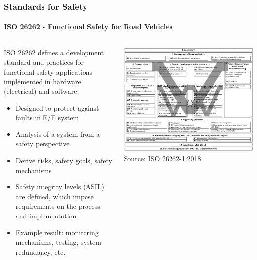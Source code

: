 \begin{frame}
\frametitle{Standards for Safety}
\framesubtitle{ISO 26262 - Functional Safety for Road Vehicles}
\begin{columns}[]
    \begin{column}{0.6\textwidth}
        ISO 26262 defines a development standard and practices for functional safety
        applications implemented in hardware (electrical) and software.\\
        \begin{itemize}
            \item Designed to protect against faults in E/E system
            \item Analysis of a system from a safety perspective
            \item Derive risks, safety goals, safety mechanisms
            \item Safety integrity levels (ASIL) are defined, which impose
                requirements on the process and implementation
            \item Example result: monitoring mechanisms, testing,
                system redundancy, etc.
        \end{itemize}
    \end{column}
    \begin{column}{0.4\textwidth}
        \centering
        \includegraphics[width=\textwidth]{images/iso26262.png}\\
        \footnotesize Source: ISO 26262-1:2018 \cite{ISO26262}
    \end{column}
\end{columns}
\end{frame}

